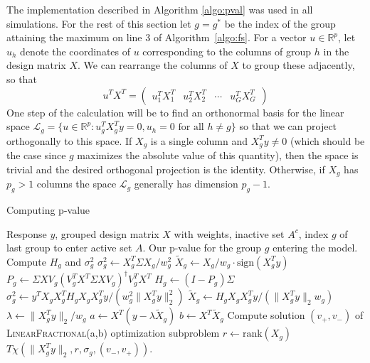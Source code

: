 \documentclass{imsart}
\newcommand{\real}{\mathbb{R}}
\newcommand{\norm}[1]{\lVert #1 \rVert}
\newcommand{\vecsp}{\mathcal{L}}
\newcommand{\gstar}{g^*}
\begin{document}
The implementation described in Algorithm \ref{algo:pval}
was used in all simulations.
For the rest of this section let $g = \gstar$ be the index of
the group attaining the maximum on line 3 of Algorithm~\ref{algo:fs}.
For a vector $u \in \real^p$, let $u_h$ denote the coordinates
of $u$ corresponding to the columns of group $h$ in the design matrix $X$.
We can rearrange the columns of $X$ to group these adjacently, so that
\[
u^TX^T = \begin{pmatrix} u_1^T X_1^T & u_2^T X_2^T & \cdots & u_G^TX_G^T \end{pmatrix}
\]
One step of the calculation will be to find an orthonormal basis for the
linear space $\vecsp_g = \{ u \in \real^p : u_g^T X_g^T y = 0, u_h = 0
\text{ for all } h \neq g \}$ so that we can project orthogonally to
this space. If $X_g$ is a single column and $X_g^Ty \neq 0$ (which
should be the case since $g$ maximizes the absolute value of this
quantity), then the
space is trivial and the desired orthogonal projection is the identity.
Otherwise, if $X_g$ has $p_g > 1$ columns the space $\vecsp_g$
generally has dimension $p_g-1$.


\begin{algorithm}
 \caption{Computing p-value}
 \label{algo:pval}
 \begin{algorithmic}
   \REQUIRE Response $y$, grouped design matrix $X$ with weights, inactive set $A^c$, index $g$ of last group to enter active set $A$.
   \ENSURE Our p-value for the group $g$ entering the model.
   \STATE Compute $H_g$ and $\sigma^2_g$
   \STATE $\sigma_g^2 \gets X_g^T\Sigma X_g/w_g^2$
   \STATE $\tilde X_g \gets X_g / w_g \cdot \text{sign}(X_g^Ty)$
   \ELSE
   \STATE $P_g \gets \Sigma XV_g (V_g^T X^T \Sigma X V_g)^\dagger V_g^TX^T$
   \STATE $H_g \gets (I - P_g)\Sigma$
   \STATE $\sigma^2_g \gets y^TX_gX_g^T H_g X_gX_g^Ty / (w_g^2 \norm{X_g^Ty}_2^2)$
   \STATE $\tilde X_g \gets H_g X_g X_g^T y /(\norm{X_g^Ty}_2 w_g)$
   \ENDIF
   \STATE $\lambda \gets \norm{X_g^Ty}_2/w_g$
   \STATE {}
   \STATE $a \gets X^T(y - \lambda \tilde X_g)$
   \STATE $b \gets X^T \tilde X_g$
   \STATE Compute solution $(v_+, v_-)$ of \textsc{LinearFractional}(a,b) optimization subproblem
   \STATE $r \gets \text{rank}(X_g)$
   \RETURN $T\chi(\|X_g^Ty\|_2, r, \sigma_g,  (v_-,v_+)).$
 \end{algorithmic}
\end{algorithm}
\end{document}
